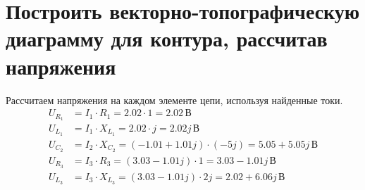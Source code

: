 \documentclass[12pt]{article}
\begin{document}
\section{Построить векторно-топографическую диаграмму для контура, рассчитав напряжения}

Рассчитаем напряжения на каждом элементе цепи, используя найденные токи.
\begin{equation*}
  \begin{aligned}
    U_{R_1} &= I_1 \cdot R_1 = 2.02 \cdot 1 = 2.02\,\text{В} \\
    U_{L_1} &= I_1 \cdot X_{L_1} = 2.02 \cdot j = 2.02j\,\text{В} \\
    U_{C_2} &= I_2 \cdot X_{C_2} = (-1.01 + 1.01j) \cdot (-5j) = 5.05 + 5.05j\,\text{В} \\
    U_{R_3} &= I_3 \cdot R_3 = (3.03 - 1.01j) \cdot 1 = 3.03 - 1.01j\,\text{В} \\
    U_{L_3} &= I_3 \cdot X_{L_3} = (3.03 - 1.01j) \cdot 2j = 2.02 + 6.06j\,\text{В} \\
  \end{aligned}
\end{equation*}
\end{document}
